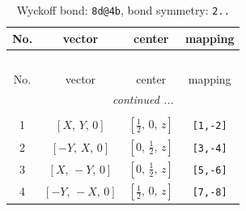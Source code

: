 \documentclass[fleqn,8pt]{jsarticle}
\begin{document}
\renewcommand{\arraystretch}{1.2}
\begin{longtable}{cccc}
\caption{Wyckoff bond: {\tt 8d@4b}, bond symmetry: {\tt 2..}}
 \\
 \hline \hline
No. & vector & center & mapping \\ \hline \endfirsthead

\multicolumn{3}{l}{\tablename\ \thetable{}} \\
 \hline \hline
No. & vector & center & mapping \\ \hline \endhead

 \hline \hline
\multicolumn{3}{r}{\footnotesize\it continued ...} \\ \endfoot

 \hline \hline
\multicolumn{3}{r}{} \\ \endlastfoot

1 & $\left[ X,\, Y,\, 0 \right]$ & $\left[ \frac{1}{2},\, 0,\, z \right]$ & {\tt [1,-2]} \\ \hline
2 & $\left[ - Y,\, X,\, 0 \right]$ & $\left[ 0,\, \frac{1}{2},\, z \right]$ & {\tt [3,-4]} \\ \hline
3 & $\left[ X,\, - Y,\, 0 \right]$ & $\left[ 0,\, \frac{1}{2},\, z \right]$ & {\tt [5,-6]} \\ \hline
4 & $\left[ - Y,\, - X,\, 0 \right]$ & $\left[ \frac{1}{2},\, 0,\, z \right]$ & {\tt [7,-8]} \\
\end{longtable}
\renewcommand{\arraystretch}{1.2}
\end{document}
